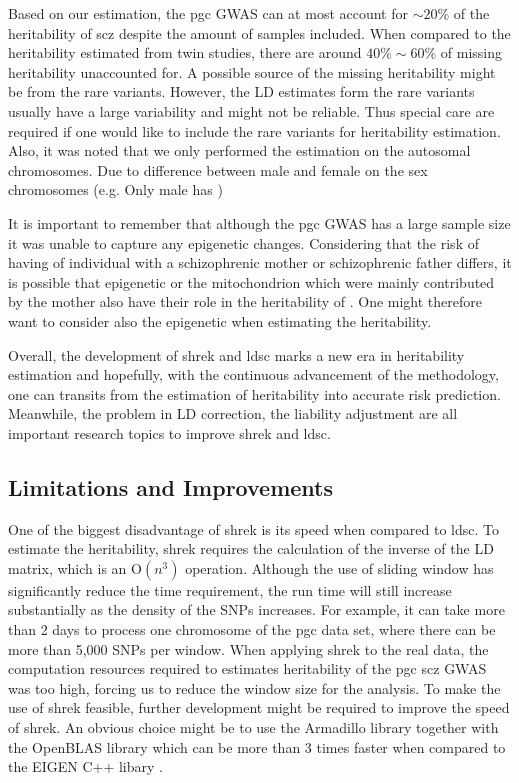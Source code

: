	Based on our estimation, the \gls{pgc}  \gls{GWAS} can at most account for $\sim20\%$ of the heritability of \gls{scz} despite the amount of samples included.
	When compared to the heritability estimated from twin studies, there are around $40\%\sim60\%$ of missing heritability unaccounted for. 
	A possible source of the missing heritability might be from the rare variants. 
	However, the \gls{LD} estimates form the rare variants usually have a large variability and might not be reliable. 
	Thus special care are required if one would like to include the rare variants for heritability estimation.
	Also, it was noted that we only performed the estimation on the autosomal chromosomes. 
	Due to difference between male and female on the sex chromosomes (e.g. Only male has )
	
	It is important to remember that although the \gls{pgc}  \gls{GWAS} has a large sample size it was unable to capture any epigenetic changes.
	Considering that the risk of having  of individual with a schizophrenic mother or schizophrenic father differs, it is possible that epigenetic or the mitochondrion which were mainly contributed by the mother also have their role in the heritability of . 
	One might therefore want to consider also the epigenetic when estimating the heritability.

	Overall, the development of \gls{shrek} and \gls{ldsc} marks a new era in heritability estimation and hopefully, with the continuous advancement of the methodology, one can transits from the estimation of heritability into accurate risk prediction.
	Meanwhile, the problem in \gls{LD} correction, the liability adjustment are all important research topics to improve \gls{shrek} and \gls{ldsc}.
	
	
	\subsection{Limitations and Improvements}
	One of the biggest disadvantage of \gls{shrek} is its speed when compared to \gls{ldsc}. 
	To estimate the heritability, \gls{shrek} requires the calculation of the inverse of the \gls{LD} matrix, which is an $\mathrm{O}(n^3)$ operation. 
	Although the use of sliding window has significantly reduce the time requirement, the run time will still increase substantially as the density of the \glspl{SNP} increases. 
	For example, it can take more than 2 days to process one chromosome of the \gls{pgc}  data set, where there can be more than 5,000 \glspl{SNP} per window.
	When applying \gls{shrek} to the real data, the computation resources required to estimates heritability of the \gls{pgc} \gls{scz} \gls{GWAS} was too high, forcing us to reduce the window size for the analysis. 
	To make the use of \gls{shrek} feasible, further development might be required to improve the speed of \gls{shrek}.
	An obvious choice might be to use the Armadillo library \citep{Sanderson2010} together with the OpenBLAS library which can be more than 3 times faster when compared to the EIGEN C++ libary \citep{Ho2011}.
	
